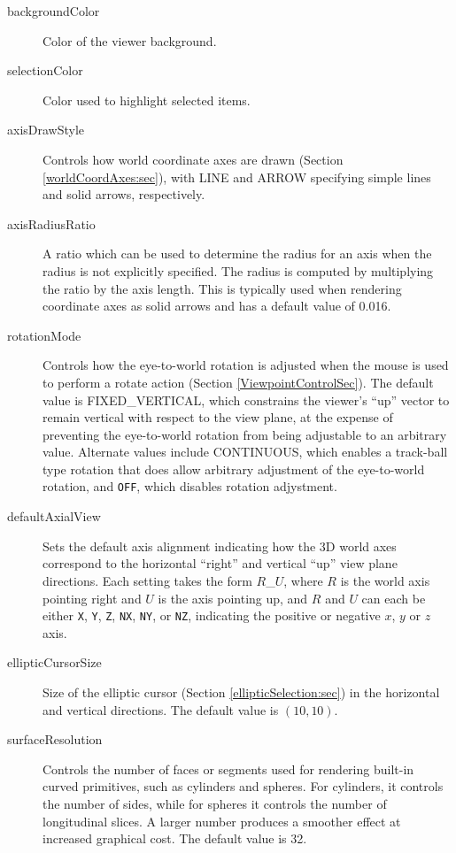 \documentclass{article}
\begin{document}
\begin{description}

\item[backgroundColor]\mbox{}

Color of the viewer background.

\item[selectionColor]\mbox{}

Color used to highlight selected items.

\item[axisDrawStyle]\mbox{}

Controls how world coordinate axes are drawn (Section
\ref{worldCoordAxes:sec}), with {\sf LINE} and {\sf ARROW} specifying
simple lines and solid arrows, respectively.

\item[axisRadiusRatio]\mbox{}

A ratio which can be used to determine the radius for an axis when the
radius is not explicitly specified. The radius is computed by
multiplying the ratio by the axis length. This is typically used when
rendering coordinate axes as solid arrows and has a default value of
0.016.

\item[rotationMode]\mbox{}

Controls how the eye-to-world rotation is adjusted when the mouse is
used to perform a rotate action (Section \ref{ViewpointControlSec}).
The default value is {\sf FIXED\_VERTICAL}, which constrains the
viewer's ``up'' vector to remain vertical with respect to the view
plane, at the expense of preventing the eye-to-world rotation from
being adjustable to an arbitrary value. Alternate values include {\sf
CONTINUOUS}, which enables a track-ball type rotation that does allow
arbitrary adjustment of the eye-to-world rotation, and {\tt OFF},
which disables rotation adjystment.

\item[defaultAxialView]\mbox{}

Sets the default axis alignment indicating how the 3D world axes
correspond to the horizontal ``right'' and vertical ``up'' view plane
directions.  Each setting takes the form $R$\_$U$, where $R$ is the
world axis pointing right and $U$ is the axis pointing up, and $R$ and
$U$ can each be either {\tt X}, {\tt Y}, {\tt Z}, {\tt NX}, {\tt NY},
or {\tt NZ}, indicating the positive or negative $x$, $y$ or $z$ axis.

\item[ellipticCursorSize]\mbox{}

Size of the elliptic cursor (Section \ref{ellipticSelection:sec}) in
the horizontal and vertical directions. The default value is
$(10, 10)$.

\item[surfaceResolution]\mbox{}

Controls the number of faces or segments used for
rendering built-in curved primitives, such as cylinders and
spheres. For cylinders, it controls the number of sides, while for
spheres it controls the number of longitudinal slices. A larger number
produces a smoother effect at increased graphical cost. The default
value is 32.

\end{description}
\end{document}
